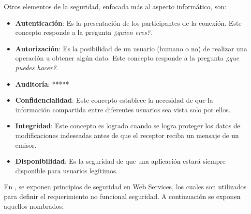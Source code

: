 Otros elementos de la seguridad, enfocada más al aspecto informático, son:

\begin{itemize}
 \item \textbf{Autenticación}: Es la presentación de los participantes de la conexión. Este concepto responde a la pregunta \textit{¿quien eres?}.
 \item \textbf{Autorización}: Es la posibilidad de un usuario (humano o no) de realizar una operación u obtener algún dato. Este concepto responde a la pregunta \textit{¿que puedes hacer?}.
 \item \textbf{Auditoría}: *****
 \item \textbf{Confidencialidad}: Este concepto establece la necesidad de que la información compartida entre diferentes usuarios sea vista solo por ellos.
 \item \textbf{Integridad}: Este concepto es logrado cuando se logra proteger los datos de modificaciones indeseadas antes de que el receptor reciba un mensaje de un emisor.
 \item \textbf{Disponibilidad}: Es la seguridad de que una aplicación estará siempre disponible para usuarios legítimos.
\end{itemize}

En \cite{security_ws}, se exponen principios de seguridad en Web Services, los cuales son utilizados para definir el requerimiento no funcional seguridad. A continuación se exponen aquellos nombrados:


